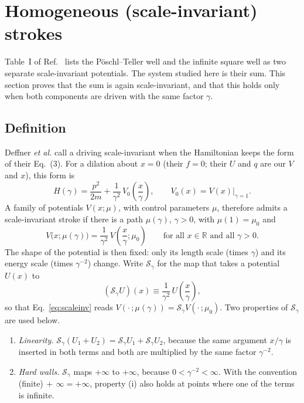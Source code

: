 \documentclass[11pt]{article}
\numberwithin{equation}{section}
\begin{document}
\section{Homogeneous (scale-invariant) strokes}
\label{sec:stroke}
Table~I of Ref.~\cite{deffner2014} lists the P\"oschl--Teller well and the infinite square well as two separate scale-invariant potentials. The system studied here is their sum. This section proves that the sum is again scale-invariant, and that this holds only when both components are driven with the same factor $\gamma$.

\subsection{Definition}
Deffner \emph{et al.} call a driving scale-invariant when the Hamiltonian keeps the form of their Eq.~(3). For a dilation about $x=0$ (their $f=0$; their $U$ and $q$ are our $V$ and $x$), this form is
\begin{equation}
H(\gamma)=\frac{p^2}{2m}+\frac{1}{\gamma^2}\,V_0\!\left(\frac{x}{\gamma}\right),\qquad V_0(x)=V(x)\big|_{\gamma=1}.
\label{eq:Hscale}
\end{equation}
A family of potentials $V(x;\mu)$, with control parameters $\mu$, therefore admits a scale-invariant stroke if there is a path $\mu(\gamma)$, $\gamma>0$, with $\mu(1)=\mu_0$ and
\begin{equation}
V\big(x;\mu(\gamma)\big)=\frac{1}{\gamma^2}\,V\!\left(\frac{x}{\gamma};\mu_0\right)\qquad\text{for all }x\in\mathbb R\text{ and all }\gamma>0 .
\label{eq:scaleinv}
\end{equation}
The shape of the potential is then fixed: only its length scale (times $\gamma$) and its energy scale (times $\gamma^{-2}$) change. Write $\mathcal S_\gamma$ for the map that takes a potential $U(x)$ to
\begin{equation}
(\mathcal S_\gamma U)(x)\equiv\frac{1}{\gamma^2}\,U\!\left(\frac{x}{\gamma}\right),
\label{eq:Sgamma}
\end{equation}
so that Eq.~\eqref{eq:scaleinv} reads $V(\cdot\,;\mu(\gamma))=\mathcal S_\gamma V(\cdot\,;\mu_0)$. Two properties of $\mathcal S_\gamma$ are used below.
\begin{enumerate}[label=(\roman*),itemsep=2pt]
\item \emph{Linearity.} $\mathcal S_\gamma(U_1+U_2)=\mathcal S_\gamma U_1+\mathcal S_\gamma U_2$, because the same argument $x/\gamma$ is inserted in both terms and both are multiplied by the same factor $\gamma^{-2}$.
\item \emph{Hard walls.} $\mathcal S_\gamma$ maps $+\infty$ to $+\infty$, because $0<\gamma^{-2}<\infty$. With the convention (finite)$\,+\,\infty=+\infty$, property (i) also holds at points where one of the terms is infinite.
\end{enumerate}
\end{document}
